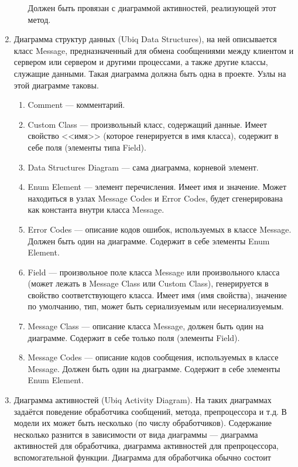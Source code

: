 \begin{enumerate}
\begin{enumerate}
				Должен быть провязан с диаграммой активностей, реализующей этот метод.
		\end{enumerate}
	\item Диаграмма структур данных (Ubiq Data Structures), на ней описывается класс 
		Message, предназначенный для обмена сообщениями между клиентом и сервером или 
		сервером и другими процессами, а также другие классы, служащие данными. Такая 
		диаграмма должна быть одна в проекте. Узлы на этой диаграмме таковы.
		\begin{enumerate}
			\item Comment --- комментарий.
			\item Custom Class --- произвольный класс, содержащий данные. Имеет свойство 
				<<имя>> (которое генерируется в имя класса), содержит в себе поля (элементы 
				типа Field).
			\item Data Structures Diagram --- сама диаграмма, корневой элемент.
			\item Enum Element --- элемент перечисления. Имеет имя и значение. Может находиться 
				в узлах Message Codes и Error Codes, будет сгенерирована как константа внутри 
				класса Message.
			\item Error Codes --- описание кодов ошибок, используемых в классе Message. 
				Должен быть один на диаграмме. Содержит в себе элементы Enum Element.
			\item Field --- произвольное поле класса Message или произвольного класса (может 
				лежать в Message Class или Custom Class), генерируется в свойство соответствующего 
				класса. Имеет имя (имя свойства), значение по умолчанию, тип, может быть сериализуемым 
				или несериализуемым.
			\item Message Class --- описание класса Message, должен быть один на диаграмме. 
				Содержит в себе только поля (элементы Field).
			\item Message Codes --- описание кодов сообщения, используемых в классе Message. 
				Должен быть один на диаграмме. Содержит в себе элементы Enum Element.
		\end{enumerate}
	\item Диаграмма активностей (Ubiq Activity Diagram). На таких диаграммах задаётся 
		поведение обработчика сообщений, метода, препроцессора и т.д. В модели их может 
		быть несколько (по числу обработчиков). Содержание несколько разнится в зависимости 
		от вида диаграммы --- диаграмма активностей для обработчика, диаграмма активностей 
		для препроцессора, вспомогательной функции. Диаграмма для обработчика обычно состоит 

\end{enumerate}
